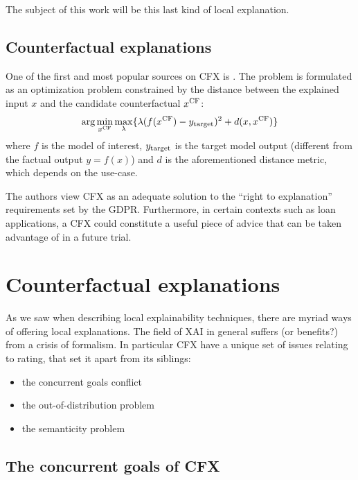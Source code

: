 \documentclass[../main.tex]{subfiles}
\begin{document}
The subject of this work will be this last kind of local explanation.

\subsection{Counterfactual explanations}

One of the first and most popular sources on CFX is \cite{wachterCounterfactual2017}. The problem is formulated as an optimization problem constrained by the distance between the explained input $x$ and the candidate counterfactual $x^\text{CF}$:
\begin{equation}
    \arg\min_{x^\text{CF}} \max_\lambda \{ \lambda (f(x^\text{CF}) - y_{\text{target}})^2 + d(x, x^\text{CF}) \}
\end{equation}
where $f$ is the model of interest, $y_{\text{target}}$ is the target model output (different from the factual output $y = f(x)$) and $d$ is the aforementioned distance metric, which depends on the use-case.

The authors view CFX as an adequate solution to the ``right to explanation'' requirements set by the GDPR. Furthermore, in certain contexts such as loan applications, a CFX could constitute a useful piece of advice that can be taken advantage of in a future trial. \citenote{}

\section{Counterfactual explanations}

As we saw when describing local explainability techniques, there are myriad ways of offering local explanations.
The field of XAI in general suffers (or benefits?) from a crisis of formalism.
In particular CFX have a unique set of issues relating to rating, that set it apart from its siblings:
\begin{itemize}
    \item the concurrent goals conflict
    \item the out-of-distribution problem
    \item the semanticity problem
\end{itemize}

\subsection{The concurrent goals of CFX}
\end{document}
